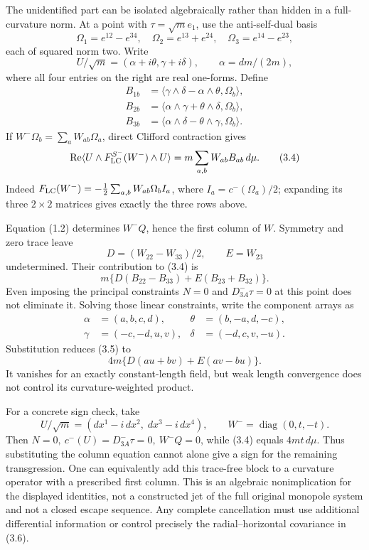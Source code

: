 \documentclass[
  10pt,
]{article}
\begin{document}
The unidentified part can be isolated algebraically rather than hidden
in a full-curvature norm. At a point with \(\tau=\sqrt m e_1\), use the
anti-self-dual basis \[
 \Omega_1=e^{12}-e^{34},\quad
 \Omega_2=e^{13}+e^{24},\quad
 \Omega_3=e^{14}-e^{23},
\] each of squared norm two. Write \[
 U/\sqrt m=(\alpha+i\theta,\gamma+i\delta),\qquad
 \alpha=dm/(2m),
\] where all four entries on the right are real one-forms. Define \[
\begin{aligned}
 B_{1b}&=\langle\gamma\wedge\delta-\alpha\wedge\theta,\Omega_b\rangle,\\
 B_{2b}&=\langle\alpha\wedge\gamma+\theta\wedge\delta,\Omega_b\rangle,\\
 B_{3b}&=\langle\alpha\wedge\delta-\theta\wedge\gamma,\Omega_b\rangle.
\end{aligned}
\] If \(W^-\Omega_b=\sum_a W_{ab}\Omega_a\), direct Clifford contraction
gives \[
 \operatorname{Re}\langle U\wedge F_{\rm LC}^{S^-}(W^-)\wedge U\rangle
          =m\sum_{a,b}W_{ab}B_{ab}\,d\mu .                  \tag{3.4}
\] Indeed \(F_{\rm LC}(W^-)=-\tfrac12\sum_{a,b}W_{ab}\Omega_b I_a\),
where \(I_a=c^-(\Omega_a)/2\); expanding its three \(2\times2\) matrices
gives exactly the three rows above.

Equation (1.2) determines \(W^-Q\), hence the first column of \(W\).
Symmetry and zero trace leave \[
 D=(W_{22}-W_{33})/2,\qquad E=W_{23}
\] undetermined. Their contribution to (3.4) is \[
 m\{D(B_{22}-B_{33})+E(B_{23}+B_{32})\}.                \tag{3.5}
\] Even imposing the principal constraints \(N=0\) and
\(D^-_{3A}\tau=0\) at this point does not eliminate it. Solving those
linear constraints, write the component arrays as \[
\begin{aligned}
 \alpha&=(a,b,c,d),&\theta&=(b,-a,d,-c),\\
 \gamma&=(-c,-d,u,v),&\delta&=(-d,c,v,-u).
\end{aligned}
\] Substitution reduces (3.5) to \[
               4m\{D(au+bv)+E(av-bu)\}.                \tag{3.6}
\] It vanishes for an exactly constant-length field, but weak length
convergence does not control its curvature-weighted product.

For a concrete sign check, take \[
 U/\sqrt m=(dx^1-i\,dx^2,\;dx^3-i\,dx^4),\qquad
 W^-=\operatorname{diag}(0,t,-t).
\] Then \(N=0,\ c^-(U)=D^-_{3A}\tau=0,\ W^-Q=0\), while (3.4) equals
\(4mt\,d\mu\). Thus substituting the column equation cannot alone give a
sign for the remaining transgression. One can equivalently add this
trace-free block to a curvature operator with a prescribed first column.
This is an algebraic nonimplication for the displayed identities, not a
constructed jet of the full original monopole system and not a closed
escape sequence. Any complete cancellation must use additional
differential information or control precisely the radial--horizontal
covariance in (3.6).
\end{document}
